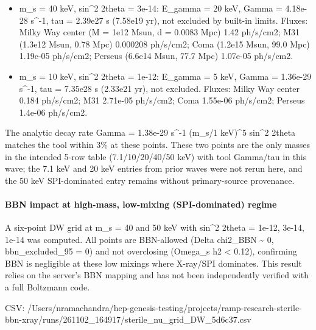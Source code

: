 \documentclass[11pt,a4paper]{article}
\begin{document}
\begin{itemize}
  \item m\_s = 40 keV, sin\textasciicircum{}2 2theta = 3e-14: E\_gamma = 20 keV, Gamma = 4.18e-28 s\textasciicircum{}-1, tau = 2.39e27 s (7.58e19 yr), not excluded by built-in limits. Fluxes: Milky Way center (M = 1e12 Msun, d = 0.0083 Mpc) 1.42 ph/s/cm2; M31 (1.3e12 Msun, 0.78 Mpc) 0.000208 ph/s/cm2; Coma (1.2e15 Msun, 99.0 Mpc) 1.19e-05 ph/s/cm2; Perseus (6.6e14 Msun, 77.7 Mpc) 1.07e-05 ph/s/cm2.
  \item m\_s = 10 keV, sin\textasciicircum{}2 2theta = 1e-12: E\_gamma = 5 keV, Gamma = 1.36e-29 s\textasciicircum{}-1, tau = 7.35e28 s (2.33e21 yr), not excluded. Fluxes: Milky Way center 0.184 ph/s/cm2; M31 2.71e-05 ph/s/cm2; Coma 1.55e-06 ph/s/cm2; Perseus 1.4e-06 ph/s/cm2.
\end{itemize}
The analytic decay rate Gamma = 1.38e-29 s\textasciicircum{}-1 (m\_s/1 keV)\textasciicircum{}5 sin\textasciicircum{}2 2theta matches the tool within 3\% at these points. These two points are the only masses in the intended 5-row table (7.1/10/20/40/50 keV) with tool Gamma/tau in this wave; the 7.1 keV and 20 keV entries from prior waves were not rerun here, and the 50 keV SPI-dominated entry remains without primary-source provenance.

\paragraph{BBN impact at high-mass, low-mixing (SPI-dominated) regime}
A six-point DW grid at m\_s = 40 and 50 keV with sin\textasciicircum{}2 2theta = 1e-12, 3e-14, 1e-14 was computed. All points are BBN-allowed (Delta chi2\_BBN \textasciitilde{} 0, bbn\_excluded\_95 = 0) and not overclosing (Omega\_s h2 \textless{} 0.12), confirming BBN is negligible at these low mixings where X-ray/SPI dominates. This result relies on the server's BBN mapping and has not been independently verified with a full Boltzmann code.

CSV: /Users/nramachandra/hep-genesis-testing/projects/ramp-research-sterile-bbn-xray/runs/261102\_164917/sterile\_nu\_grid\_DW\_5d6c37.csv
\end{document}
